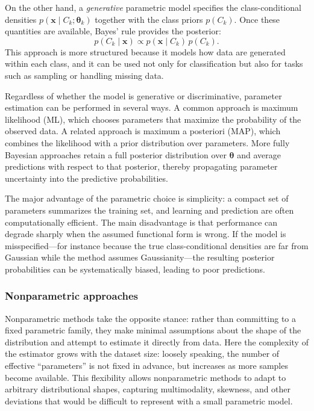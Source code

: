 On the other hand, a \emph{generative} parametric model specifies the class-conditional densities \(p(\mathbf{x}\mid C_k; \boldsymbol{\theta}_k)\) together with the class priors \(p(C_k)\). Once these quantities are available, Bayes' rule provides the posterior:
\[
p(C_k \mid \mathbf{x}) \propto p(\mathbf{x}\mid C_k)\,p(C_k).
\]
This approach is more structured because it models how data are generated within each class, and it can be used not only for classification but also for tasks such as sampling or handling missing data.

Regardless of whether the model is generative or discriminative, parameter estimation can be performed in several ways. A common approach is maximum likelihood (ML), which chooses parameters that maximize the probability of the observed data. A related approach is maximum a posteriori (MAP), which combines the likelihood with a prior distribution over parameters. More fully Bayesian approaches retain a full posterior distribution over \(\boldsymbol{\theta}\) and average predictions with respect to that posterior, thereby propagating parameter uncertainty into the predictive probabilities.

The major advantage of the parametric choice is simplicity: a compact set of parameters summarizes the training set, and learning and prediction are often computationally efficient. The main disadvantage is that performance can degrade sharply when the assumed functional form is wrong. If the model is misspecified---for instance because the true class-conditional densities are far from Gaussian while the method assumes Gaussianity---the resulting posterior probabilities can be systematically biased, leading to poor predictions.

\medskip

\subsubsection*{Nonparametric approaches}

Nonparametric methods take the opposite stance: rather than committing to a fixed parametric family, they make minimal assumptions about the shape of the distribution and attempt to estimate it directly from data. Here the complexity of the estimator grows with the dataset size: loosely speaking, the number of effective ``parameters'' is not fixed in advance, but increases as more samples become available. This flexibility allows nonparametric methods to adapt to arbitrary distributional shapes, capturing multimodality, skewness, and other deviations that would be difficult to represent with a small parametric model.


